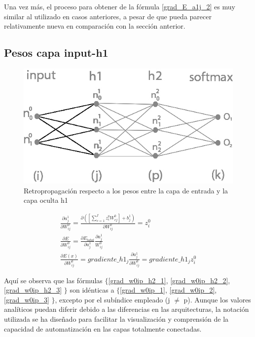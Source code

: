 Una vez más, el proceso para obtener de la fórmula \ref{grad_E_a1j_2} es muy similar al utilizado en casos anteriores, a pesar de que pueda parecer relativamente nueva en comparación con la sección anterior. \\


\subsection{Pesos capa input-h1}

\begin{figure}[H]
	\centering
	\includegraphics[scale=0.35]{imagenes/nn_2_capa_pesos_input_h1.jpg}  
	\caption{Retropropagación respecto a los pesos entre la capa de entrada y la capa oculta h1}
	\label{fig:nn_2_pesos_input_h1}
\end{figure}


\begin{gather}
	\frac{\partial a^1_j }{\partial W^0_{ij} } = \frac{\partial ([\sum_{c=1}^{I} z^0_c   W^0_{cj}] + b^1_j)}{\partial W^0_{ij} } = z^0_i \label{grad_w0ip_h2_1} \\
	\frac{\partial E}{\partial W^0_{ij}} = \frac{\partial E_{total} }{\partial a^1_j }   \frac{\partial a^1_j}{W^0_{ij}} \label{grad_w0ip_h2_2} \\
	\frac{\partial E(x) }{\partial W^0_{ij} } = gradiente\_h1_j   \frac{\partial a^1_j }{\partial W^0_{ij} } = gradiente\_h1_j   z^0_i \label{grad_w0ip_h2_3}
\end{gather}

Aquí se observa que las fórmulas $\{$\ref{grad_w0ip_h2_1}, \ref{grad_w0ip_h2_2}, \ref{grad_w0ip_h2_3} $\}$ son idénticas a $\{$\ref{grad_w0ip_1}, \ref{grad_w0ip_2}, \ref{grad_w0ip_3} $\}$, excepto por el subíndice empleado (j $\neq$ p). Aunque los valores analíticos puedan diferir debido a las diferencias en las arquitecturas, la notación utilizada se ha diseñado para facilitar la visualización y comprensión de la capacidad de automatización en las capas totalmente conectadas.

